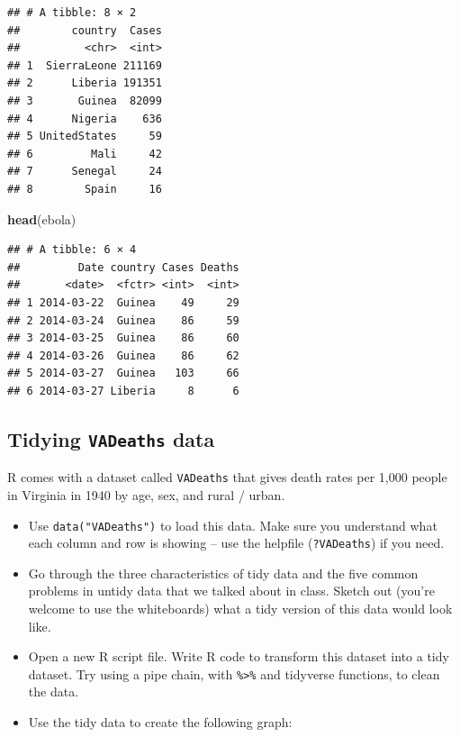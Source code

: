 \documentclass[]{book}
\makeatletter
\newenvironment{Shaded}{\begin{snugshade}}{\end{snugshade}}
\newcommand{\KeywordTok}[1]{\textcolor[rgb]{0.13,0.29,0.53}{\textbf{{#1}}}}
\newcommand{\NormalTok}[1]{{#1}}
\providecommand{\tightlist}{%
  \setlength{\itemsep}{0pt}\setlength{\parskip}{0pt}}
\newenvironment{kframe}{%
\medskip{}
\setlength{\fboxsep}{.8em}
 \def\at@end@of@kframe{}%
 \ifinner\ifhmode%
  \def\at@end@of@kframe{\end{minipage}}%
  \begin{minipage}{\columnwidth}%
 \fi\fi%
 \def\FrameCommand##1{\hskip\@totalleftmargin \hskip-\fboxsep
 \colorbox{shadecolor}{##1}\hskip-\fboxsep
     \hskip-\linewidth \hskip-\@totalleftmargin \hskip\columnwidth}%
 \MakeFramed {\advance\hsize-\width
   \@totalleftmargin\z@ \linewidth\hsize
   \@setminipage}}%
 {\par\unskip\endMakeFramed%
 \at@end@of@kframe}
\renewenvironment{Shaded}{\begin{kframe}}{\end{kframe}}
\makeatother
\begin{document}
\begin{verbatim}
## # A tibble: 8 × 2
##        country  Cases
##          <chr>  <int>
## 1  SierraLeone 211169
## 2      Liberia 191351
## 3       Guinea  82099
## 4      Nigeria    636
## 5 UnitedStates     59
## 6         Mali     42
## 7      Senegal     24
## 8        Spain     16
\end{verbatim}

\begin{Shaded}
\begin{Highlighting}[]
\KeywordTok{head}\NormalTok{(ebola)}
\end{Highlighting}
\end{Shaded}

\begin{verbatim}
## # A tibble: 6 × 4
##         Date country Cases Deaths
##       <date>  <fctr> <int>  <int>
## 1 2014-03-22  Guinea    49     29
## 2 2014-03-24  Guinea    86     59
## 3 2014-03-25  Guinea    86     60
## 4 2014-03-26  Guinea    86     62
## 5 2014-03-27  Guinea   103     66
## 6 2014-03-27 Liberia     8      6
\end{verbatim}

\subsection{\texorpdfstring{Tidying \texttt{VADeaths}
data}{Tidying VADeaths data}}\label{tidying-vadeaths-data}

R comes with a dataset called \texttt{VADeaths} that gives death rates
per 1,000 people in Virginia in 1940 by age, sex, and rural / urban.

\begin{itemize}
\tightlist
\item
  Use \texttt{data("VADeaths")} to load this data. Make sure you
  understand what each column and row is showing -- use the helpfile
  (\texttt{?VADeaths}) if you need.
\item
  Go through the three characteristics of tidy data and the five common
  problems in untidy data that we talked about in class. Sketch out
  (you're welcome to use the whiteboards) what a tidy version of this
  data would look like.
\item
  Open a new R script file. Write R code to transform this dataset into
  a tidy dataset. Try using a pipe chain, with
  \texttt{\%\textgreater{}\%} and tidyverse functions, to clean the
  data.
\item
  Use the tidy data to create the following graph:
\end{itemize}
\end{document}
